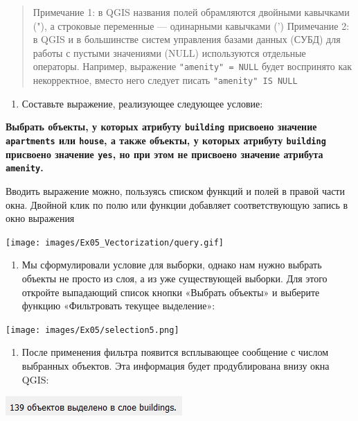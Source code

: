 \documentclass[
  12pt,
]{book}
\providecommand{\tightlist}{%
  \setlength{\itemsep}{0pt}\setlength{\parskip}{0pt}}
\begin{document}
\begin{quote}
Примечание 1: в QGIS названия полей обрамляются двойными кавычками ("), а строковые переменные --- одинарными кавычками (')
Примечание 2: в QGIS и в большинстве систем управления базами данных (СУБД) для работы с пустыми значениями (NULL) используются отдельные операторы. Например, выражение \texttt{"amenity"\ =\ NULL} будет воспринято как некорректное, вместо него следует писать \texttt{"amenity"\ IS\ NULL}
\end{quote}

\begin{enumerate}
\def\labelenumi{\arabic{enumi}.}
\setcounter{enumi}{6}
\tightlist
\item
  Составьте выражение, реализующее следующее условие:
\end{enumerate}

\textbf{Выбрать объекты, у которых атрибуту \texttt{building} присвоено значение \texttt{apartments} или \texttt{house}, а также объекты, у которых атрибуту \texttt{building} присвоено значение \texttt{yes}, но при этом не присвоено значение атрибута \texttt{amenity}.}

Вводить выражение можно, пользуясь списком функций и полей в правой части окна. Двойной клик по полю или функции добавляет соответствующую запись в окно выражения

\texttt{[image: images/Ex05\_Vectorization/query.gif]}

\begin{enumerate}
\def\labelenumi{\arabic{enumi}.}
\setcounter{enumi}{10}
\tightlist
\item
  Мы сформулировали условие для выборки, однако нам нужно выбрать объекты не просто из слоя, а из уже существующей выборки. Для этого откройте выпадающий список кнопки «Выбрать объекты» и выберите функцию «Фильтровать текущее выделение»:
\end{enumerate}

\texttt{[image: images/Ex05/selection5.png]}

\begin{enumerate}
\def\labelenumi{\arabic{enumi}.}
\setcounter{enumi}{11}
\tightlist
\item
  После применения фильтра появится всплывающее сообщение с числом выбранных объектов. Эта информация будет продублирована внизу окна QGIS:
\end{enumerate}

\includegraphics{images/Ex05_Vectorization/select_from_selection.png}
\end{document}
